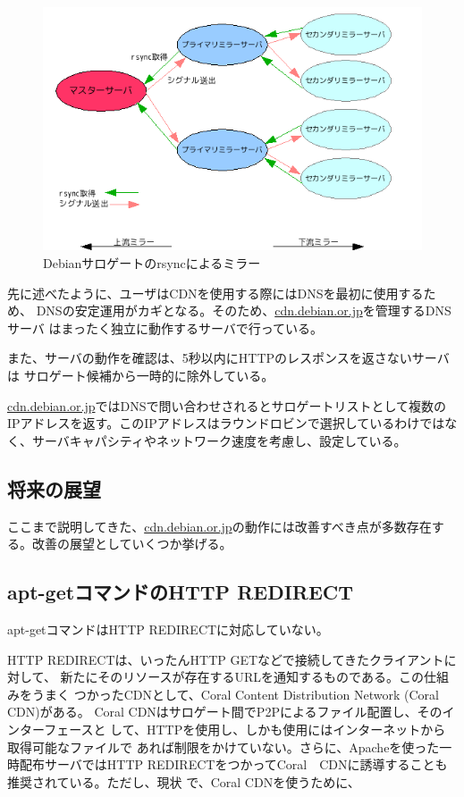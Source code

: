 \documentclass[mingoth,a4paper]{jsarticle}
\begin{document}
\begin{figure}[H]
\includegraphics[width=\hsize]{image200708/pushmirror.png}
 \caption{Debianサロゲートのrsyncによるミラー}
 \label{fig:rsyncsurrogatemirror}
\end{figure}

先に述べたように、ユーザはCDNを使用する際にはDNSを最初に使用するため、
DNSの安定運用がカギとなる。そのため、\url{cdn.debian.or.jp}を管理するDNSサーバ
はまったく独立に動作するサーバで行っている。

また、サーバの動作を確認は、5秒以内にHTTPのレスポンスを返さないサーバは
サロゲート候補から一時的に除外している。

\url{cdn.debian.or.jp}ではDNSで問い合わせされるとサロゲートリストとして複数の
IPアドレスを返す。このIPアドレスはラウンドロビンで選択しているわけではな
く、サーバキャパシティやネットワーク速度を考慮し、設定している。

\subsection{将来の展望}

ここまで説明してきた、\url{cdn.debian.or.jp}の動作には改善すべき点が多数存在す
る。改善の展望としていくつか挙げる。

\subsection{apt-getコマンドのHTTP REDIRECT}
apt-getコマンドはHTTP REDIRECTに対応していない。

HTTP REDIRECTは、いったんHTTP GETなどで接続してきたクライアントに対して、
新たにそのリソースが存在するURLを通知するものである。この仕組みをうまく
つかったCDNとして、Coral Content Distribution Network (Coral CDN)がある。
Coral CDNはサロゲート間でP2Pによるファイル配置し、そのインターフェースと
して、HTTPを使用し、しかも使用にはインターネットから取得可能なファイルで
あれば制限をかけていない。さらに、Apacheを使った一時配布サーバではHTTP
REDIRECTをつかってCoral　CDNに誘導することも推奨されている。ただし、現状
で、Coral CDNを使うために、
\end{document}
